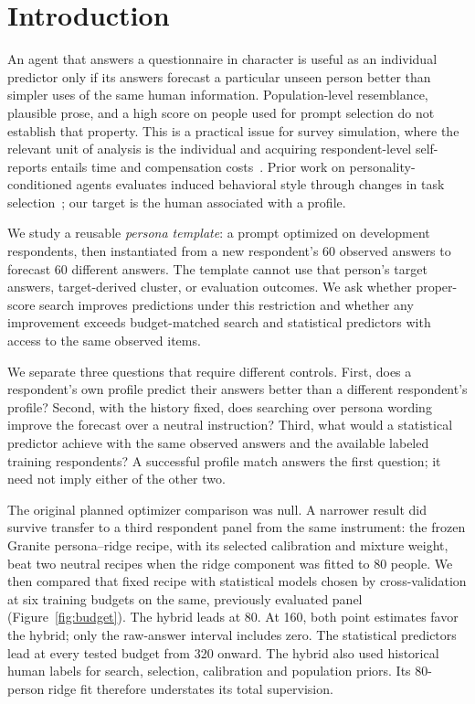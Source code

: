 \documentclass[10pt,twocolumn]{article}
\begin{document}
\section{Introduction}
An agent that answers a questionnaire in character is useful as an individual
predictor only if its answers forecast a particular unseen person better than
simpler uses of the same human information. Population-level resemblance,
plausible prose, and a high score on people used for prompt selection do not
establish that property. This is a practical issue for survey simulation,
where the relevant unit of analysis is the individual and acquiring
respondent-level self-reports entails time and compensation costs~\cite{park2026selfreports}.
Prior work on personality-conditioned agents evaluates induced behavioral
style through changes in task selection~\cite{newsham2025personality}; our
target is the human associated with a profile.

We study a reusable \emph{persona template}: a prompt optimized on development
respondents, then instantiated from a new respondent's 60 observed answers
to forecast 60 different answers. The template cannot use that person's target
answers, target-derived cluster, or evaluation outcomes. We ask whether
proper-score search improves predictions under this restriction and whether
any improvement exceeds budget-matched search and statistical predictors
with access to the same observed items.

We separate three questions that require different controls. First, does a
respondent's own profile predict their answers better than a different
respondent's profile? Second, with the history fixed, does searching over
persona wording improve the forecast over a neutral instruction? Third,
what would a statistical predictor achieve with the same observed answers
and the available labeled training respondents? A successful profile match
answers the first question; it need not imply either of the other two.

The original planned optimizer comparison was null. A narrower result did
survive transfer to a third respondent panel from the same instrument: the
frozen Granite persona--ridge recipe, with its selected calibration and
mixture weight, beat two neutral recipes when the ridge component was fitted
to 80 people. We then compared that fixed recipe with statistical models
chosen by cross-validation at six training budgets on the same, previously
evaluated panel (Figure~\ref{fig:budget}). The hybrid leads at 80. At
160, both point estimates favor the hybrid; only the raw-answer interval
includes zero. The statistical predictors lead at every tested budget from
320 onward. The hybrid also used historical human labels for search,
selection, calibration and population priors. Its 80-person ridge fit
therefore understates its total supervision.
\end{document}
